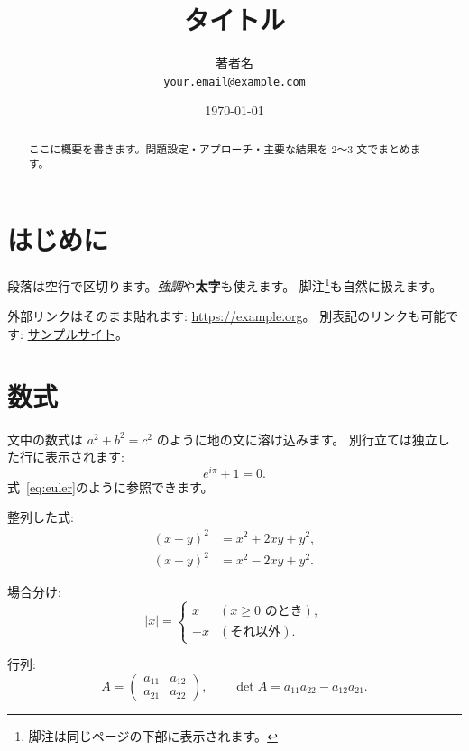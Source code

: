 \documentclass[a4paper,11pt]{ltjsarticle}
\title{タイトル}
\author{著者名\\\small \texttt{your.email@example.com}}
\date{\today}
\theoremstyle{plain}
\theoremstyle{definition}
\theoremstyle{remark}
\newcommand{\abs}[1]{\left\lvert #1 \right\rvert}
\begin{document}
\maketitle

\begin{abstract}
ここに概要を書きます。問題設定・アプローチ・主要な結果を 2〜3 文でまとめます。
\end{abstract}

\tableofcontents
\bigskip

\section{はじめに}
\label{sec:intro}

段落は空行で区切ります。\emph{強調}や\textbf{太字}も使えます。
脚注\footnote{脚注は同じページの下部に表示されます。}も自然に扱えます。

外部リンクはそのまま貼れます: \url{https://example.org}。
別表記のリンクも可能です: \href{https://example.org}{サンプルサイト}。

\section{数式}
\label{sec:math}

文中の数式は $a^2 + b^2 = c^2$ のように地の文に溶け込みます。
別行立ては独立した行に表示されます:
\begin{equation}
  \label{eq:euler}
  e^{i\pi} + 1 = 0.
\end{equation}
式~\eqref{eq:euler}のように参照できます。

整列した式:
\begin{align}
  (x + y)^2 &= x^2 + 2xy + y^2, \\
  (x - y)^2 &= x^2 - 2xy + y^2.
\end{align}

場合分け:
\begin{equation}
  \abs{x} =
  \begin{cases}
    x  & (x \ge 0 \text{ のとき}), \\
    -x & (\text{それ以外}).
  \end{cases}
\end{equation}

行列:
\begin{equation}
  A =
  \begin{pmatrix}
    a_{11} & a_{12} \\
    a_{21} & a_{22}
  \end{pmatrix},
  \qquad
  \det A = a_{11} a_{22} - a_{12} a_{21}.
\end{equation}
\end{document}
